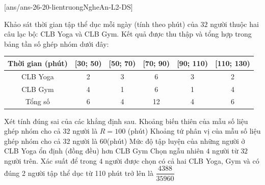 \cauds
{}[ans/ans-26-20-lientruongNgheAn-L2-DS]
\begin{ex}%
	Khảo sát thời gian tập thể dục mỗi ngày (tính theo phút) của $32$ người thuộc hai câu lạc bộ: CLB Yoga và CLB Gym. Kết quả được thu thập và tổng hợp trong bảng tần số ghép nhóm dưới đây:
	\begin{center}
		\begin{tabular}{|c|c|c|c|c|c|}
			\hline
			Thời gian (phút) & [30; 50) & [50; 70) & [70; 90) & [90; 110) & [110; 130) \\
			\hline
			CLB Yoga	& 2 & 3 & 6 & 3 & 2 \\
			\hline
			CLB Gym	& 4 & 1 & 6 & 1 & 4 \\
			\hline
			Tổng số	& 6 & 4 & 12 & 4 & 6 \\
			\hline
		\end{tabular}
	\end{center}
	Xét tính đúng sai của các khẳng định sau.
	\choiceTF
	{\True Khoảng biến thiên của mẫu số liệu ghép nhóm cho cả $32$ người là $R=100$ (phút)}
	{Khoảng tứ phân vị của mẫu số liệu ghép nhóm cho cả $32$ người là $60$(phút)}
	{\True Mức độ tập luyện của những người ở CLB Yoga ổn định (đồng đều) hơn CLB Gym}
	{\True Chọn ngẫu nhiên $4$ người từ $32$ người trên. Xác suất để trong $4$ người được chọn có cả hai CLB Yoga, Gym và có đúng 2 người tập thể dục từ 110 phút trở lên là $\dfrac{4388}{35960}$}
\end{ex}
